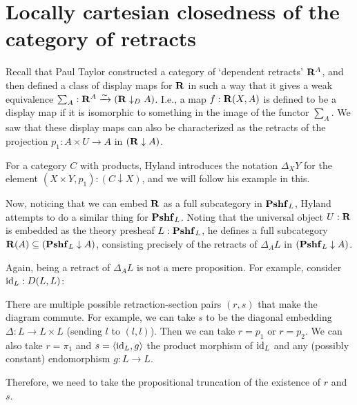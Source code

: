 \section{Locally cartesian closedness of the category of retracts}

Recall that Paul Taylor constructed a category of `dependent retracts' $ \mathbf{R}^A $, and then defined a class of display maps for $ \mathbf{R} $ in such a way that it gives a weak equivalence $ \sum_A : \mathbf{R}^A \xrightarrow{\sim} (\mathbf{R} \downarrow_D A) $. I.e., a map $ f: \mathbf{R}(X, A) $ is defined to be a display map if it is isomorphic to something in the image of the functor $ \sum_A $. We saw that these display maps can also be characterized as the retracts of the projection $ p_1: A \times U \to A $ in $ (\mathbf{R} \downarrow A) $.

For a category $ C $ with products, Hyland introduces the notation $ \Delta_X Y $ for the element $ (X \times Y, p_1) : (C \downarrow X) $, and we will follow his example in this.

Now, noticing that we can embed $ \mathbf{R} $ as a full subcategory in $ \mathbf{Pshf}_{L} $, Hyland attempts to do a similar thing for $ \mathbf{Pshf}_{L} $. Noting that the universal object $ U : \mathbf{R} $ is embedded as the theory presheaf $ L : \mathbf{Pshf}_{L} $, he defines a full subcategory $ \mathbf{R}(A) \subseteq (\mathbf{Pshf}_{L} \downarrow A) $, consisting precisely of the retracts of $ \Delta_A L $ in $ (\mathbf{Pshf}_{L} \downarrow A) $.

\begin{remark}
  Again, being a retract of $ \Delta_A L $ is not a mere proposition. For example, consider $ \text{id}_{L} : D(L, L) $:
  \begin{center}
  \end{center}
  There are multiple possible retraction-section pairs $ (r, s) $ that make the diagram commute. For example, we can take $ s $ to be the diagonal embedding $ \Delta : L \to L \times L $ (sending $ l $ to $ (l, l) $). Then we can take $ r = p_1 $ or $ r = p_2 $. We can also take $ r = \pi_1 $ and $ s = \langle \text{id}_{L}, g \rangle $ the product morphism of $ \text{id}_{L} $ and any (possibly constant) endomorphism $ g: L \to L $.

  Therefore, we need to take the propositional truncation of the existence of $ r $ and $ s $.
\end{remark}

